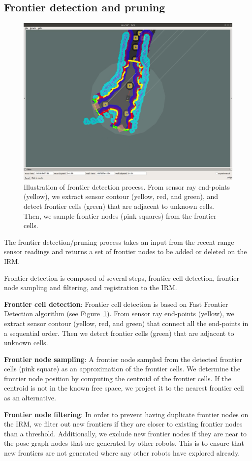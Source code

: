 \documentclass{article}
\newcommand{\ph}[1]{{\textbf{#1}:}} %
\begin{document}
\subsection{Frontier detection and pruning}

\begin{figure}[t!]
  \centering
  \includegraphics[trim={7cm 9cm 10cm 5cm},clip,width=.48\textwidth,angle=180]{figures/frontier_detection.png}
  \caption{Illustration of frontier detection process.
    From sensor ray end-points (yellow), we extract sensor contour (yellow, red, and green), and detect frontier cells (green) that are adjacent to unknown cells. Then, we sample frontier nodes (pink squares) from the frontier cells.}
  \label{fig:frontiering}
\end{figure}

The frontier detection/pruning process takes an input from the recent range sensor readings and returns a set of frontier nodes to be added or deleted on the IRM.

Frontier detection is composed of several steps, frontier cell detection, frontier node sampling and filtering, and registration to the IRM.

\ph{Frontier cell detection}
Frontier cell detection is based on Fast Frontier Detection algorithm \cite{keidar2012robot} (see Figure~\ref{fig:frontiering}).
From sensor ray end-points (yellow), we extract sensor contour (yellow, red, and green) that connect all the end-points in a sequential order.
Then we detect frontier cells (green) that are adjacent to unknown cells.

\ph{Frontier node sampling}
A frontier node sampled from the detected frontier cells (pink square) as an approximation of the frontier cells.
We determine the frontier node position by computing the centroid of the frontier cells.
If the centroid is not in the known free space, we project it to the nearest frontier cell as an alternative. 

\ph{Frontier node filtering}
In order to prevent having duplicate frontier nodes on the IRM, we filter out new frontiers if they are closer to existing frontier nodes than a threshold.
Additionally, we exclude new frontier nodes if they are near to the pose graph nodes that are generated by other robots.
This is to ensure that new frontiers are not generated where any other robots have explored already.
\end{document}
